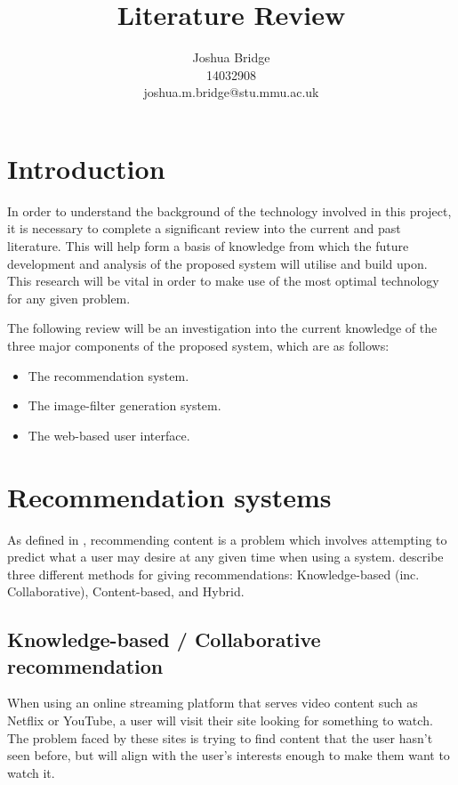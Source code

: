 \documentclass[a4paper,12pt]{article}
\title{Literature Review}
\author{Joshua Bridge \\14032908 \\joshua.m.bridge@stu.mmu.ac.uk}
\begin{document}
\maketitle


\tableofcontents

\listoffigures

\doublespacing

\section{Introduction}
  In order to understand the background of the technology involved in this project, it is necessary to complete a significant review into the current and past literature. This will help form a basis of knowledge from which the future development and analysis of the proposed system will utilise and build upon. This research will be vital in order to make use of the most optimal technology for any given problem.

  The following review will be an investigation into the current knowledge of the three major components of the proposed system, which are as follows:

  \begin{itemize}
    \item The recommendation system.
    \item The image-filter generation system.
    \item The web-based user interface.
  \end{itemize}

\section{Recommendation systems}
  As defined in \cite{ricci2011introduction}, recommending content is a problem which involves attempting to predict what a user may desire at any given time when using a system. \cite{jannach2010recommender} describe three different methods for giving recommendations: Knowledge-based (inc. Collaborative), Content-based,  and Hybrid.

  \subsection{Knowledge-based / Collaborative recommendation}
  When using an online streaming platform that serves video content such as Netflix or YouTube, a user will visit their site looking for something to watch. The problem faced by these sites is trying to find content that the user hasn't seen before, but will align with the user's interests enough to make them want to watch it.
\end{document}
